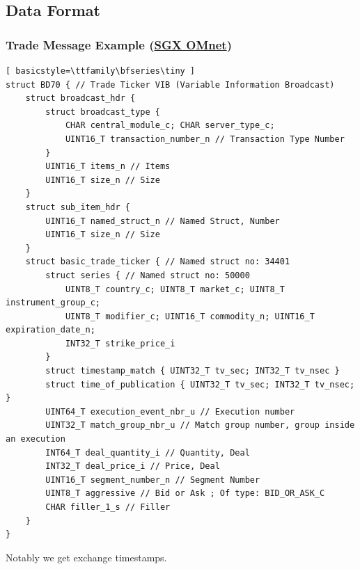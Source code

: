 \documentclass{article}
\begin{document}
\subsection{Data Format}
\subsubsection{Trade Message Example (\href{https://api2.sgx.com/sites/default/files/2026-06/OMnet_MessRef_SGX_va42.pdf}{SGX OMnet})}
\begin{lstlisting}[ basicstyle=\ttfamily\bfseries\tiny ]
struct BD70 { // Trade Ticker VIB (Variable Information Broadcast)
	struct broadcast_hdr {
		struct broadcast_type {
			CHAR central_module_c; CHAR server_type_c;
			UINT16_T transaction_number_n // Transaction Type Number
		}
		UINT16_T items_n // Items
		UINT16_T size_n // Size
	}
	struct sub_item_hdr {
		UINT16_T named_struct_n // Named Struct, Number
		UINT16_T size_n // Size
	}
	struct basic_trade_ticker { // Named struct no: 34401
		struct series { // Named struct no: 50000
			UINT8_T country_c; UINT8_T market_c; UINT8_T instrument_group_c;
			UINT8_T modifier_c; UINT16_T commodity_n; UINT16_T expiration_date_n;
			INT32_T strike_price_i
		}
		struct timestamp_match { UINT32_T tv_sec; INT32_T tv_nsec }
		struct time_of_publication { UINT32_T tv_sec; INT32_T tv_nsec; }
		UINT64_T execution_event_nbr_u // Execution number
		UINT32_T match_group_nbr_u // Match group number, group inside an execution
		INT64_T deal_quantity_i // Quantity, Deal
		INT32_T deal_price_i // Price, Deal
		UINT16_T segment_number_n // Segment Number
		UINT8_T aggressive // Bid or Ask ; Of type: BID_OR_ASK_C
		CHAR filler_1_s // Filler
	}
}
\end{lstlisting}
Notably we get exchange timestamps.
\end{document}
